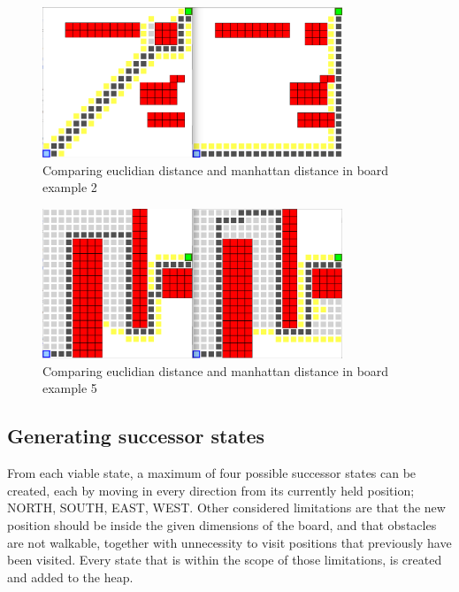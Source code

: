 \begin{figure}[h!]
	\centering
	\includegraphics[width=0.8\textwidth]{module_1/images/run_ex2}
	\caption{Comparing euclidian distance and manhattan distance in board example 2}
	\label{run:ex2}
\end{figure}

\begin{figure}[h!]
	\centering
	\includegraphics[width=0.8\textwidth]{module_1/images/run_ex5}
	\caption{Comparing euclidian distance and manhattan distance in board example 5}
	\label{run:ex5}
\end{figure}

\subsection{Generating successor states}
From each viable state, a maximum of four possible successor states can be created, each by moving in every direction from its currently held position; NORTH, SOUTH, EAST, WEST. Other considered limitations are that the new position should be inside the given dimensions of the board, and that obstacles are not walkable, together with unnecessity to visit positions that previously have been visited. Every state that is within the scope of those limitations, is created and added to the heap.